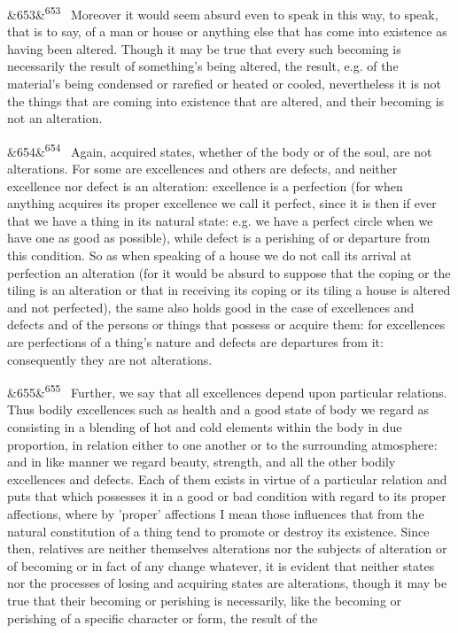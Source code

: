 \documentclass[12pt]{article}
\newcommand{\para}[1][]{\par\noindent\ifx&#1&\else\textsuperscript{\footnotesize #1}~\fi}
\begin{document}
\para[653] Moreover it would seem absurd even to speak in this way, to speak, that is to say, of a man or house or anything else that has come into existence as having been altered. Though it may be true that every such becoming is necessarily the result of something's being altered, the result, e.g. of the material's being condensed or rarefied or heated or cooled, nevertheless it is not the things that are coming into existence that are altered, and their becoming is not an alteration.

\para[654] Again, acquired states, whether of the body or of the soul, are not alterations. For some are excellences and others are defects, and neither excellence nor defect is an alteration: excellence is a perfection (for when anything acquires its proper excellence we call it perfect, since it is then if ever that we have a thing in its natural state: e.g. we have a perfect circle when we have one as good as possible), while defect is a perishing of or departure from this condition. So as when speaking of a house we do not call its arrival at perfection an alteration (for it would be absurd to suppose that the coping or the tiling is an alteration or that in receiving its coping or its tiling a house is altered and not perfected), the same also holds good in the case of excellences and defects and of the persons or things that possess or acquire them: for excellences are perfections of a thing's nature and defects are departures from it: consequently they are not alterations.

\para[655] Further, we say that all excellences depend upon particular relations. Thus bodily excellences such as health and a good state of body we regard as consisting in a blending of hot and cold elements within the body in due proportion, in relation either to one another or to the surrounding atmosphere: and in like manner we regard beauty, strength, and all the other bodily excellences and defects. Each of them exists in virtue of a particular relation and puts that which possesses it in a good or bad condition with regard to its proper affections, where by 'proper' affections I mean those influences that from the natural constitution of a thing tend to promote or destroy its existence. Since then, relatives are neither themselves alterations nor the subjects of alteration or of becoming or in fact of any change whatever, it is evident that neither states nor the processes of losing and acquiring states are alterations, though it may be true that their becoming or perishing is necessarily, like the becoming or perishing of a specific character or form, the result of the
\end{document}
